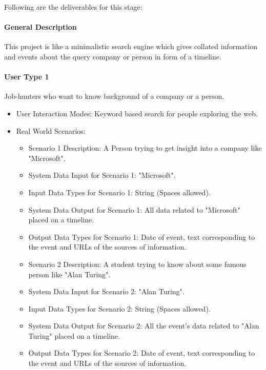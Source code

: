 Following are the deliverables for this stage:

\paragraph{General Description}
This project is like a minimalistic search engine which gives collated
information and events about the query company or person in form of a timeline.

\paragraph{User Type 1}
Job-hunters who want to know background of a company or a person.
\begin{itemize}
\item User Interaction Modes: Keyword based search for people exploring the web.
\item Real World Scenarios:
  \begin{itemize}
  \item Scenario 1 Description: A Person trying to get insight into a company
    like "Microsoft".
  \item System Data Input for Scenario 1: "Microsoft".
  \item Input Data Types for Scenario 1: String (Spaces allowed).
  \item System Data Output for Scenario 1: All data related to "Microsoft"
    placed on a timeline.
  \item Output Data Types for Scenario 1: Date of event, text corresponding to
    the event and URLs of the sources of information.
  \item Scenario 2 Description: A student trying to know about some famous
    person like "Alan Turing".
  \item System Data Input for Scenario 2: "Alan Turing".
  \item Input Data Types for Scenario 2: String (Spaces allowed).
  \item System Data Output for Scenario 2: All the event's data related to
    "Alan Turing" placed on a timeline.
  \item Output Data Types for Scenario 2: Date of event, text corresponding to
    the event and URLs of the sources of information.
  \end{itemize}
\end{itemize}

